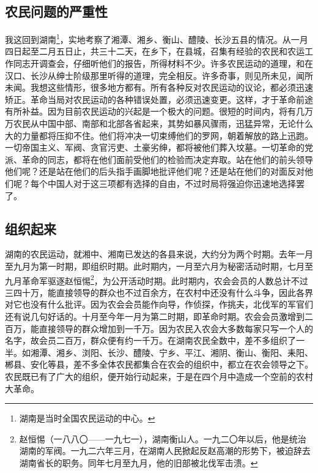 \documentclass[cn,11pt,chinese]{elegantbook}
\def\myformat#1{\hfil\hfil #1}
\begin{document}
\subsection*{\myformat{农民问题的严重性}}
我这回到湖南\footnote[1]{ 湖南是当时全国农民运动的中心。}，实地考察了湘潭、湘乡、衡山、醴陵、长沙五县的情况。从一月四日起至二月五日止，共三十二天，在乡下，在县城，召集有经验的农民和农运工作同志开调查会，仔细听他们的报告，所得材料不少。许多农民运动的道理，和在汉口、长沙从绅士阶级那里听得的道理，完全相反。许多奇事，则见所未见，闻所未闻。我想这些情形，很多地方都有。所有各种反对农民运动的议论，都必须迅速矫正。革命当局对农民运动的各种错误处置，必须迅速变更。这样，才于革命前途有所补益。因为目前农民运动的兴起是一个极大的问题。很短的时间内，将有几万万农民从中国中部、南部和北部各省起来，其势如暴风骤雨，迅猛异常，无论什么大的力量都将压抑不住。他们将冲决一切束缚他们的罗网，朝着解放的路上迅跑。一切帝国主义、军阀、贪官污吏、土豪劣绅，都将被他们葬入坟墓。一切革命的党派、革命的同志，都将在他们面前受他们的检验而决定弃取。站在他们的前头领导他们呢？还是站在他们的后头指手画脚地批评他们呢？还是站在他们的对面反对他们呢？每个中国人对于这三项都有选择的自由，不过时局将强迫你迅速地选择罢了。\\
\subsection*{\myformat{组织起来}}
 湖南的农民运动，就湘中、湘南已发达的各县来说，大约分为两个时期。去年一月至九月为第一时期，即组织时期。此时期内，一月至六月为秘密活动时期，七月至九月革命军驱逐赵恒惕\footnote[2]{ 赵恒惕（一八八〇——一九七一），湖南衡山人。一九二〇年以后，他是统治湖南的军阀。一九二六年三月，在湖南人民掀起反赵高潮的形势下，被迫辞去湖南省长的职务。同年七月至九月，他的旧部被北伐军击溃。}，为公开活动时期。此时期内，农会会员的人数总计不过三四十万，能直接领导的群众也不过百余方，在农村中还没有什么斗争，因此各界对它也没有什么批评。因为农会会员能作向导，作侦探，作挑夫，北伐军的军官们还有说几句好话的。十月至今年一月为第二时期，即革命时期。农会会员激增到二百万，能直接领导的群众增加到一千万。因为农民入农会大多数每家只写一个人的名字，故会员二百万，群众便有约一千万。在湖南农民全数中，差不多组织了一半。如湘潭、湘乡、浏阳、长沙、醴陵、宁乡、平江、湘阴、衡山、衡阳、耒阳、郴县、安化等县，差不多全体农民都集合在农会的组织中，都立在农会领导之下。农民既已有了广大的组织，便开始行动起来，于是在四个月中造成一个空前的农村大革命。\\
\end{document}
